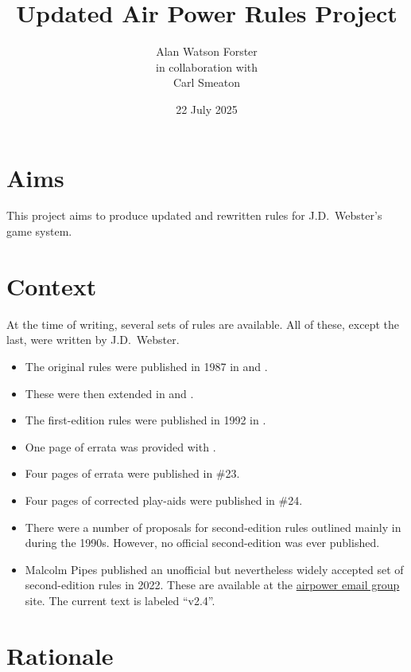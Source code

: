 \documentclass[10pt]{report}
\title{Updated Air Power Rules Project}
\author{%
    Alan Watson Forster\\[2ex]
    in collaboration with\\[2ex]
    Carl Smeaton
}
\date{22 July 2025}
\begin{document}
\twocolumn
\thispagestyle{empty}
\maketitle
\suppressfloats
\sloppy

\section{Aims}

This project aims to produce updated and rewritten rules for J.D.\ Webster's {\AirPow} game system.

\section{Context}

At the time of writing, several sets of rules are available. All of these, except the last, were written by J.D.\ Webster.

\begin{itemize}
    \item The original rules were published in 1987 in {\AirSup} and {\AirStr}.
    \item These were then extended in {\DF} and {\EOTG}.
    \item The first-edition {\AirPow} rules were published in 1992 in {\TSOH}. 
    \item One page of errata was provided with {\TSOH}.
    \item Four pages of errata were published in {\APJ} \#23.
    \item Four pages of corrected play-aids were published in {\APJ} \#24.
    \item There were a number of proposals for second-edition {\AirPow} rules outlined mainly in {\APJ} during the 1990s. However, no official second-edition was ever published.
    \item Malcolm Pipes published an unofficial but nevertheless widely accepted set of second-edition {\AirPow} rules in 2022. These are available at the \href{https://airpower.groups.io/g/main}{airpower email group} site. The current text is labeled “v2.4”.
\end{itemize}


\section{Rationale}
\end{document}
